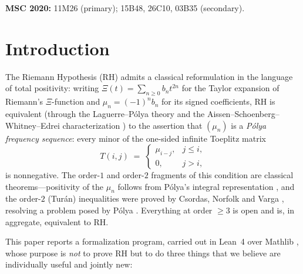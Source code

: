 \documentclass[11pt,a4paper]{article}
\theoremstyle{definition}
\begin{document}
\noindent\textbf{MSC 2020:} 11M26 (primary); 15B48, 26C10, 03B35 (secondary).

\tableofcontents
\clearpage

\section{Introduction}\label{sec:intro}

The Riemann Hypothesis (RH) \cite{Riemann1859} admits a classical
reformulation in the language of total positivity: writing
$\Xi(t) = \sum_{n \ge 0} b_n t^{2n}$ for the Taylor expansion of Riemann's
$\Xi$-function and $\mu_n = (-1)^n b_n$ for its signed coefficients, RH is
equivalent (through the Laguerre--P\'olya theory and the
Aissen--Schoenberg--Whitney--Edrei characterization
\cite{ASW1952,Edrei1953}) to the assertion that $(\mu_n)$ is a
\emph{P\'olya frequency sequence}: every minor of the one-sided infinite
Toeplitz matrix
\[
  T(i,j) \;=\; \begin{cases} \mu_{i-j}, & j \le i,\\ 0, & j > i,\end{cases}
\]
is nonnegative.  The order-$1$ and order-$2$ fragments of this condition are
classical theorems---positivity of the $\mu_n$ follows from P\'olya's
integral representation \cite{Polya1926}, and the order-$2$ (Tur\'an)
inequalities were proved by Csordas, Norfolk and Varga \cite{CNV1986},
resolving a problem posed by P\'olya \cite{Polya1927}.  Everything at order
$\ge 3$ is open and is, in aggregate, equivalent to RH.

This paper reports a formalization program, carried out in Lean~4 over
Mathlib \cite{Mathlib2020,Lean4}, whose purpose is \emph{not} to prove RH
but to do three things that we believe are individually useful and jointly
new:
\end{document}
